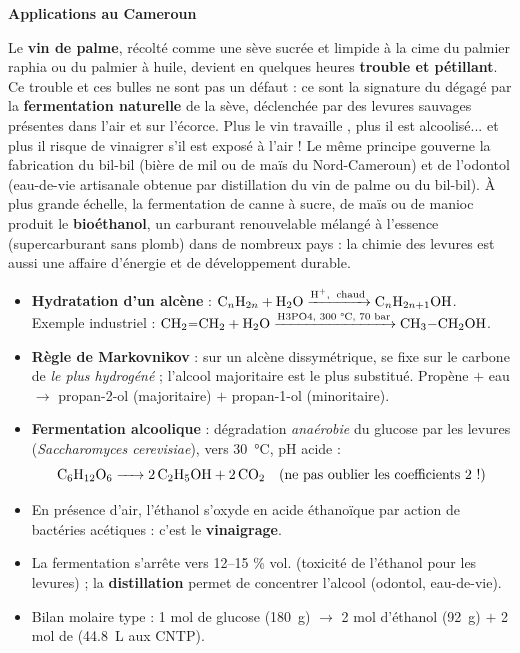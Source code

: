 \documentclass[11pt]{article}
\begin{document}
\textbf{Applications au Cameroun}\par

\begin{savaistu}
Le \textbf{vin de palme}, récolté comme une sève sucrée et limpide à la cime du palmier raphia ou du palmier à huile, devient en quelques heures \textbf{trouble et pétillant}. Ce trouble et ces bulles ne sont pas un défaut : ce sont la signature du  dégagé par la \textbf{fermentation naturelle} de la sève, déclenchée par des levures sauvages présentes dans l'air et sur l'écorce. Plus le vin \og travaille \fg{}, plus il est alcoolisé... et plus il risque de vinaigrer s'il est exposé à l'air ! Le même principe gouverne la fabrication du \og bil-bil \fg{} (bière de mil ou de maïs du Nord-Cameroun) et de l'odontol (eau-de-vie artisanale obtenue par distillation du vin de palme ou du bil-bil). À plus grande échelle, la fermentation de canne à sucre, de maïs ou de manioc produit le \textbf{bioéthanol}, un carburant renouvelable mélangé à l'essence (supercarburant sans plomb) dans de nombreux pays : la chimie des levures est aussi une affaire d'énergie et de développement durable.
\end{savaistu}

\begin{aretenir}
\begin{itemize}
\item \textbf{Hydratation d'un alcène} : $\ce{C_nH_{2n} + H2O ->[H+,\ \text{chaud}] C_nH_{2n+1}OH}$. Exemple industriel : $\ce{CH2=CH2 + H2O ->[\text{H3PO4, 300 °C, 70 bar}] CH3-CH2OH}$.
\item \textbf{Règle de Markovnikov} : sur un alcène dissymétrique,  se fixe sur le carbone de  \emph{le plus hydrogéné} ; l'alcool majoritaire est le plus substitué. Propène $+$ eau $\rightarrow$ propan-2-ol (majoritaire) $+$ propan-1-ol (minoritaire).
\item \textbf{Fermentation alcoolique} : dégradation \emph{anaérobie} du glucose par les levures (\emph{Saccharomyces cerevisiae}), vers \SI{30}{\celsius}, pH acide :
\[ \ce{C6H12O6 -> 2 C2H5OH + 2 CO2} \quad \text{(ne pas oublier les coefficients 2 !)} \]
\item En présence d'air, l'éthanol s'oxyde en acide éthanoïque par action de bactéries acétiques : c'est le \textbf{vinaigrage}.
\item La fermentation s'arrête vers 12--15 \% vol. (toxicité de l'éthanol pour les levures) ; la \textbf{distillation} permet de concentrer l'alcool (odontol, eau-de-vie).
\item Bilan molaire type : 1 mol de glucose (\SI{180}{g}) $\rightarrow$ 2 mol d'éthanol (\SI{92}{g}) $+$ 2 mol de  (\SI{44,8}{L} aux CNTP).
\end{itemize}
\end{aretenir}
\end{document}
